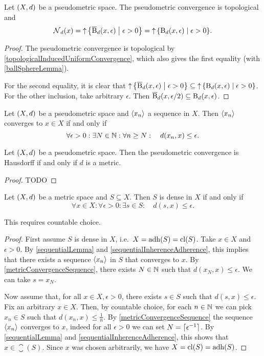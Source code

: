 \begin{lemma} \label{metricConvergenceNeighbourhood}
Let $\sSet{X,d}$ be a pseudometric space. The pseudometric convergence is topological and
\[ \neighbourhood_d(x) = \upset\setbuilder{\cball_d(x,\epsilon)}{\epsilon >0} = \upset\setbuilder{\ball_d(x,\epsilon)}{\epsilon >0}. \]
\end{lemma}
\begin{proof}
The pseudometric convergence is topological by \ref{topologicalInducedUniformConvergence}, which also gives the first equality (with \ref{ballSphereLemma}). 

For the second equality, it is clear that $\upset\setbuilder{\cball_d(x,\epsilon)}{\epsilon >0} \subseteq \upset\setbuilder{\ball_d(x,\epsilon)}{\epsilon >0}$. For the other inclusion, take arbitrary $\epsilon$. Then $\operatorname{\overline{B}}_d(x,\epsilon/2)\subseteq \operatorname{B}_d(x,\epsilon)$.
\end{proof}
\begin{corollary} \label{metricConvergenceSequence}
Let $\sSet{X,d}$ be a pseudometric space and $\left\langle x_n \right\rangle$ a sequence in $X$. Then $\left\langle x_n \right\rangle$ converges to $x\in X$ \textup{if and only if}
\[ \forall \epsilon>0: \exists N\in\mathbb{N}: \forall n\geq N: \quad d(x_n,x)\leq \epsilon. \]
\end{corollary}

\begin{proposition} \label{metricConvergenceHausdorff}
Let $\sSet{X,d}$ be a pseudometric space. Then the pseudometric convergence is Hausdorff \textup{if and only if} $d$ is a metric.
\end{proposition}
\begin{proof}
TODO
\end{proof}

\begin{lemma} \label{metricDensityLemma}
Let $\sSet{X,d}$ be a metric space and $S\subseteq X$. Then $S$ is dense in $X$ \textup{if and only if}
\[ \forall x\in X: \forall \epsilon >0: \exists s\in S: \quad d(s,x) \leq \epsilon. \]
\end{lemma}
This requires countable choice.
\begin{proof}
First assume $S$ is dense in $X$, i.e.\ $X = \operatorname{adh}(S) = \operatorname{cl}(S)$. Take $x\in X$ and $\epsilon >0$. By \ref{sequentialLemma} and \ref{sequentialInherenceAdherence}, this implies that there exists a sequence $\left\langle x_n \right\rangle$ in $S$ that converges to $x$. By \ref{metricConvergenceSequence}, there exists $N\in \mathbb{N}$ such that $d(x_N, x)\leq \epsilon$. We can take $s = x_N$.

Now assume that, for all $x\in X, \epsilon >0$, there exists $s\in S$ such that $d(s,x)\leq \epsilon$. Fix an arbitrary $x\in X$. Then, by countable choice, for each $n\in \mathbb{N}$ we can pick $x_n\in S$ such that $d(x_n, x)\leq \frac{1}{n}$. By \ref{metricConvergenceSequence} the sequence $\left\langle x_n \right\rangle$ converges to $x$, indeed for all $\epsilon >0$ we can set $N = \lceil\epsilon^{-1}\rceil$. By \ref{sequentialLemma} and \ref{sequentialInherenceAdherence}, this shows that $x\in \closure(S)$. Since $x$ was chosen arbitrarily, we have $X = \operatorname{cl}(S) = \operatorname{adh}(S)$.
\end{proof}

